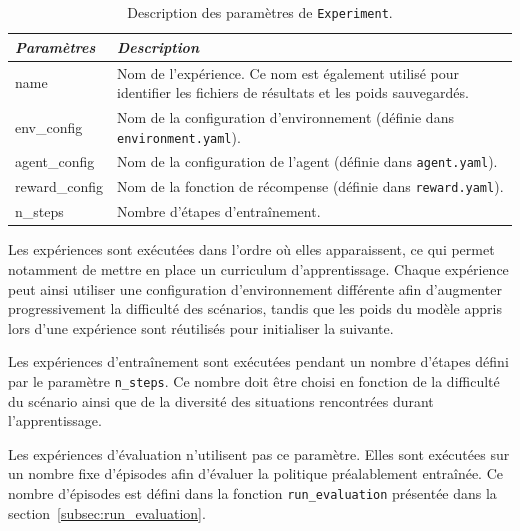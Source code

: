 \begin{table}[h]
    \centering
    \caption{Description des paramètres de \texttt{Experiment}.}
    \label{tab:experiments_parameters}
    \begin{tabularx}{\textwidth}{>{\ttfamily\small}l X}
        \toprule
        \textnormal{\textit{Paramètres}} & \textit{Description}                                                                                                  \\
        \midrule
        name                             & Nom de l'expérience. Ce nom est également utilisé pour identifier les fichiers de résultats et les poids sauvegardés. \\

        env\_config                      & Nom de la configuration d'environnement (définie dans \texttt{environment.yaml}).                                     \\

        agent\_config                    & Nom de la configuration de l'agent (définie dans \texttt{agent.yaml}).                                                \\

        reward\_config                   & Nom de la fonction de récompense (définie dans \texttt{reward.yaml}).                                                 \\

        n\_steps                         & Nombre d'étapes d'entraînement.                                                                                       \\


        \bottomrule
    \end{tabularx}
\end{table}

\noindent Les expériences sont exécutées dans l'ordre où elles apparaissent, ce qui permet notamment de mettre en place un curriculum d'apprentissage. Chaque expérience peut ainsi utiliser une configuration d'environnement différente afin d'augmenter progressivement la difficulté des scénarios, tandis que les poids du modèle appris lors d'une expérience sont réutilisés pour initialiser la suivante.

\begin{tcolorbox}[colback=YellowGreen!5,colframe=YellowGreen,title=Remarque]

    Les expériences d'entraînement sont exécutées pendant un nombre d'étapes défini par le paramètre \texttt{n\_steps}. Ce nombre doit être choisi en fonction de la difficulté du scénario ainsi que de la diversité des situations rencontrées durant l'apprentissage.

    Les expériences d'évaluation n'utilisent pas ce paramètre. Elles sont exécutées sur un nombre fixe d'épisodes afin d'évaluer la politique préalablement entraînée. Ce nombre d'épisodes est défini dans la fonction \texttt{run\_evaluation} présentée dans la section~\ref{subsec:run_evaluation}.

\end{tcolorbox}

